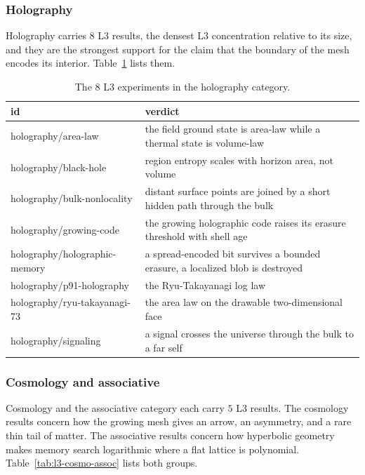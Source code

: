 \subsubsection{Holography}

Holography carries $8$ L3 results, the densest L3 concentration relative to its size, and they are the strongest support for the claim that the boundary of the mesh encodes its interior. Table~\ref{tab:l3-holography} lists them.

\begin{table}[ht]
\centering
\begin{tabular}{@{}ll@{}}
\toprule
id & verdict \\
\midrule
holography/area-law & the field ground state is area-law while a thermal state is volume-law \\
holography/black-hole & region entropy scales with horizon area, not volume \\
holography/bulk-nonlocality & distant surface points are joined by a short hidden path through the bulk \\
holography/growing-code & the growing holographic code raises its erasure threshold with shell age \\
holography/holographic-memory & a spread-encoded bit survives a bounded erasure, a localized blob is destroyed \\
holography/p91-holography & the Ryu-Takayanagi log law \\
holography/ryu-takayanagi-73 & the area law on the drawable two-dimensional face \\
holography/signaling & a signal crosses the universe through the bulk to a far self \\
\bottomrule
\end{tabular}
\caption{The $8$ L3 experiments in the holography category.}
\label{tab:l3-holography}
\end{table}

\subsubsection{Cosmology and associative}

Cosmology and the associative category each carry $5$ L3 results. The cosmology results concern how the growing mesh gives an arrow, an asymmetry, and a rare thin tail of matter. The associative results concern how hyperbolic geometry makes memory search logarithmic where a flat lattice is polynomial. Table~\ref{tab:l3-cosmo-assoc} lists both groups.

